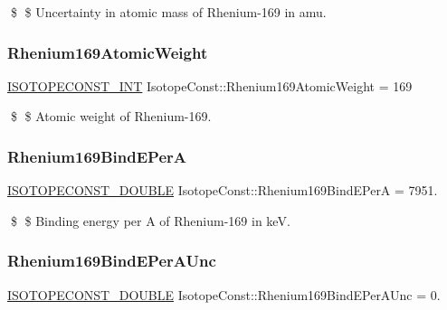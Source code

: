 \$ \$ Uncertainty in atomic mass of Rhenium-\/169 in amu. \mbox{\label{group___isotope_const-_rhenium-_re169_ga052a484714d4e71887fbd1c661e4517c}} 
\subsubsection{\texorpdfstring{Rhenium169\+Atomic\+Weight}{Rhenium169AtomicWeight}}
{\footnotesize\ttfamily \mbox{\hyperlink{group___isotope_const-_macros_ga5f18360b3e99483a35c32d789e62621c}{I\+S\+O\+T\+O\+P\+E\+C\+O\+N\+S\+T\+\_\+\+I\+NT}} Isotope\+Const\+::\+Rhenium169\+Atomic\+Weight = 169}

\$ \$ Atomic weight of Rhenium-\/169. \mbox{\label{group___isotope_const-_rhenium-_re169_ga48f535d1682cc97720ac0c526be23fbd}} 
\subsubsection{\texorpdfstring{Rhenium169\+Bind\+E\+PerA}{Rhenium169BindEPerA}}
{\footnotesize\ttfamily \mbox{\hyperlink{group___isotope_const-_macros_ga8f45a7272ce02c0b4c65c44636ed719a}{I\+S\+O\+T\+O\+P\+E\+C\+O\+N\+S\+T\+\_\+\+D\+O\+U\+B\+LE}} Isotope\+Const\+::\+Rhenium169\+Bind\+E\+PerA = 7951.}

\$ \$ Binding energy per A of Rhenium-\/169 in keV. \mbox{\label{group___isotope_const-_rhenium-_re169_ga52994ab04d2b32ea9675ff2803fa40f7}} 
\subsubsection{\texorpdfstring{Rhenium169\+Bind\+E\+Per\+A\+Unc}{Rhenium169BindEPerAUnc}}
{\footnotesize\ttfamily \mbox{\hyperlink{group___isotope_const-_macros_ga8f45a7272ce02c0b4c65c44636ed719a}{I\+S\+O\+T\+O\+P\+E\+C\+O\+N\+S\+T\+\_\+\+D\+O\+U\+B\+LE}} Isotope\+Const\+::\+Rhenium169\+Bind\+E\+Per\+A\+Unc = 0.}


